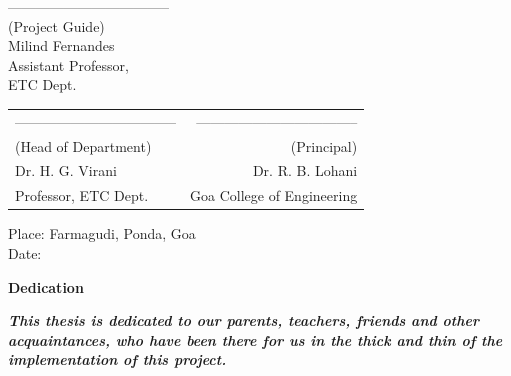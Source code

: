 \noindent -----------------------------------\\
(Project Guide)\\
Milind Fernandes\\
Assistant Professor,\\
ETC Dept.\\



\begin{table}[H]
\begin{tabular}{lr}
\noindent ----------------------------------- & \hspace{6cm} ----------------------------------- \\
(Head of Department) & (Principal)\\
Dr. H. G. Virani & Dr. R. B. Lohani \\
Professor, ETC Dept. & Goa College of Engineering\\
\end{tabular}
\end{table}
\noindent Place: Farmagudi, Ponda, Goa\\
\noindent Date: 

\newpage

\begin{center}
\begin{huge}
\bfseries{Dedication}
\end{huge}
\end{center}
\textbf{\textit {This thesis is dedicated to our parents, teachers, friends and
other acquaintances, who have been there for us in the thick
and thin of the implementation of this project.}}
